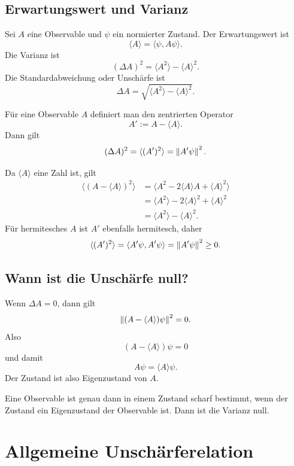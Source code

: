 \subsection{Erwartungswert und Varianz}

Sei $A$ eine Observable und $\psi$ ein normierter Zustand. Der Erwartungswert ist
\[
    \langle A\rangle=\langle\psi,A\psi\rangle.
\]
Die Varianz ist
\[
    (\Delta A)^2=\langle A^2\rangle-\langle A\rangle^2.
\]
Die Standardabweichung oder Unschärfe ist
\[
    \Delta A=\sqrt{\langle A^2\rangle-\langle A\rangle^2}.
\]

\begin{definitionbox}
Für eine Observable $A$ definiert man den zentrierten Operator
\[
    A' := A-\langle A\rangle.
\]
Dann gilt
\[
    (\Delta A)^2=\langle (A')^2\rangle=\left\lVert A'\psi \right\rVert^2.
\]
\end{definitionbox}

\begin{derivationbox}
Da $\langle A\rangle$ eine Zahl ist, gilt
\[
\begin{aligned}
    \langle(A-\langle A\rangle)^2\rangle
    &=\langle A^2-2\langle A\rangle A+\langle A\rangle^2\rangle \\
    &=\langle A^2\rangle-2\langle A\rangle^2+\langle A\rangle^2 \\
    &=\langle A^2\rangle-\langle A\rangle^2.
\end{aligned}
\]
Für hermitesches $A$ ist $A'$ ebenfalls hermitesch, daher
\[
    \langle(A')^2\rangle=\langle A'\psi,A'\psi\rangle=\left\lVert A'\psi \right\rVert^2\ge0.
\]
\end{derivationbox}

\subsection{Wann ist die Unschärfe null?}

Wenn $\Delta A=0$, dann gilt
\[
    \left\lVert (A-\langle A\rangle)\psi \right\rVert^2=0.
\]
Also
\[
    (A-\langle A\rangle)\psi=0
\]
und damit
\[
    A\psi=\langle A\rangle\psi.
\]
Der Zustand ist also Eigenzustand von $A$.

\begin{conceptbox}
Eine Observable ist genau dann in einem Zustand scharf bestimmt, wenn der Zustand ein Eigenzustand der Observable ist. Dann ist die Varianz null.
\end{conceptbox}

\section{Allgemeine Unschärferelation}

